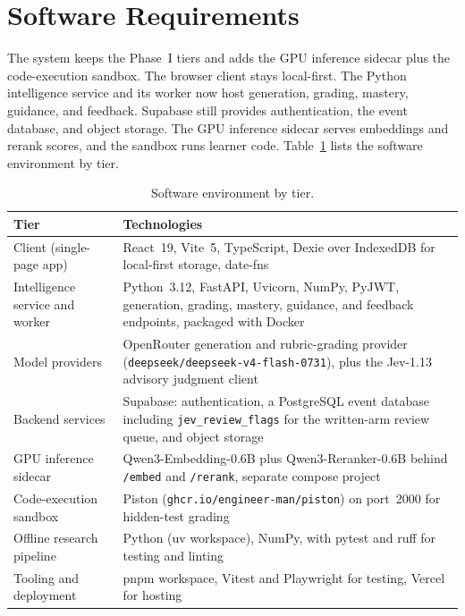 \section{Software Requirements}
The system keeps the Phase~I tiers and adds the GPU inference sidecar plus the code-execution sandbox. The browser client stays local-first. The Python intelligence service and its worker now host generation, grading, mastery, guidance, and feedback. Supabase still provides authentication, the event database, and object storage. The GPU inference sidecar serves embeddings and rerank scores, and the sandbox runs learner code. Table~\ref{tab:software} lists the software environment by tier.

\begin{table}[htbp]
\centering
\caption{Software environment by tier.}
\label{tab:software}
\begin{tabular}{p{3.6cm} p{8.6cm}}
\toprule
\textbf{Tier} & \textbf{Technologies} \\
\midrule
Client (single-page app) & React~19, Vite~5, TypeScript, Dexie over IndexedDB for local-first storage, date-fns \\
Intelligence service and worker & Python~3.12, FastAPI, Uvicorn, NumPy, PyJWT, generation, grading, mastery, guidance, and feedback endpoints, packaged with Docker \\
Model providers & OpenRouter generation and rubric-grading provider (\texttt{deepseek/deepseek-v4-flash-0731}), plus the Jev-1.13 advisory judgment client \\
Backend services & Supabase: authentication, a PostgreSQL event database including \texttt{jev\_review\_flags} for the written-arm review queue, and object storage \\
GPU inference sidecar & Qwen3-Embedding-0.6B plus Qwen3-Reranker-0.6B behind \texttt{/embed} and \texttt{/rerank}, separate compose project \\
Code-execution sandbox & Piston (\texttt{ghcr.io/engineer-man/piston}) on port~2000 for hidden-test grading \\
Offline research pipeline & Python (uv workspace), NumPy, with pytest and ruff for testing and linting \\
Tooling and deployment & pnpm workspace, Vitest and Playwright for testing, Vercel for hosting \\
\bottomrule
\end{tabular}
\end{table}

